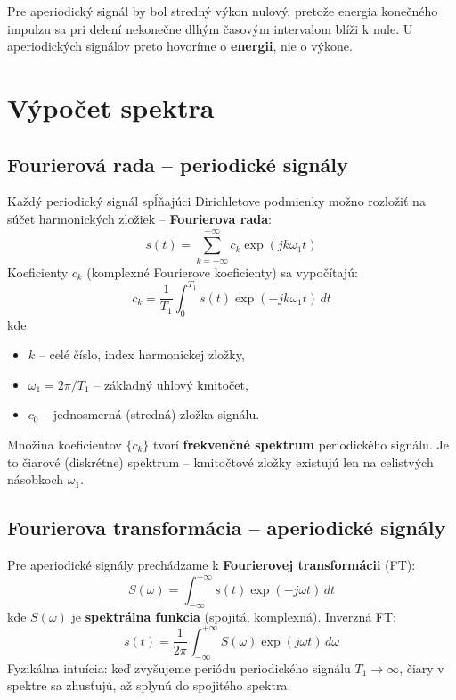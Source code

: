 Pre aperiodický signál by bol stredný výkon nulový, pretože energia konečného impulzu sa pri delení nekonečne dlhým časovým intervalom blíži k nule. U aperiodických signálov preto hovoríme o \textbf{energii}, nie o výkone.

\section{Výpočet spektra}

\subsection{Fourierová rada -- periodické signály}

Každý periodický signál spĺňajúci Dirichletove podmienky možno rozložiť na súčet harmonických zložiek -- \textbf{Fourierova rada}:
\begin{equation}
  s(t) = \sum_{k=-\infty}^{+\infty} c_k \exp(jk\omega_1 t)
\end{equation}
Koeficienty $c_k$ (komplexné Fourierove koeficienty) sa vypočítajú:
\begin{equation}
  c_k = \frac{1}{T_1} \int_0^{T_1} s(t)\exp(-jk\omega_1 t)\,dt
\end{equation}
kde:
\begin{itemize}
  \item $k$ -- celé číslo, index harmonickej zložky,
  \item $\omega_1 = 2\pi/T_1$ -- základný uhlový kmitočet,
  \item $c_0$ -- jednosmerná (stredná) zložka signálu.
\end{itemize}
Množina koeficientov $\{c_k\}$ tvorí \textbf{frekvenčné spektrum} periodického signálu. Je to čiarové (diskrétne) spektrum -- kmitočtové zložky existujú len na celistvých násobkoch $\omega_1$.

\subsection{Fourierova transformácia -- aperiodické signály}

Pre aperiodické signály prechádzame k \textbf{Fourierovej transformácii} (FT):
\begin{equation}
  S(\omega) = \int_{-\infty}^{+\infty} s(t)\exp(-j\omega t)\,dt
\end{equation}
kde $S(\omega)$ je \textbf{spektrálna funkcia} (spojitá, komplexná). Inverzná FT:
\begin{equation}
  s(t) = \frac{1}{2\pi}\int_{-\infty}^{+\infty} S(\omega)\exp(j\omega t)\,d\omega
\end{equation}
Fyzikálna intuícia: keď zvyšujeme periódu periodického signálu $T_1 \to \infty$, čiary v spektre sa zhusťujú, až splynú do spojitého spektra.

